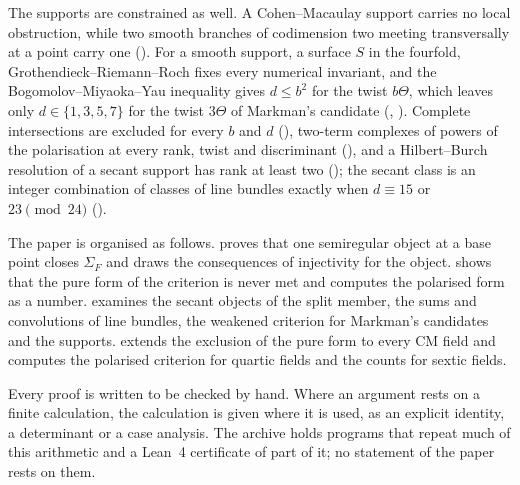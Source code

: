 The supports are constrained as well. A Cohen--Macaulay support carries no
local obstruction, while two smooth branches of codimension two meeting
transversally at a point carry one (). For a smooth support, a surface $S$ in the
fourfold, Grothendieck--Riemann--Roch fixes every numerical invariant, and the
Bogomolov--Miyaoka--Yau inequality gives $d\le b^{2}$ for the twist
$b\Theta$, which leaves only $d\in\{1,3,5,7\}$ for the twist $3\Theta$ of
Markman's candidate (,
). Complete
intersections are excluded for every $b$ and $d$ (), two-term
complexes of powers of the polarisation at every rank, twist and
discriminant (), and a Hilbert--Burch resolution of a
secant support has rank at least two (); the secant
class is an integer combination of classes of line bundles exactly when
$d\equiv15$ or $23\pmod{24}$ ().


The paper is organised as follows.  proves that one
semiregular object at a base point closes $\Sigma_{F}$ and draws the
consequences of injectivity for the object.  shows that
the pure form of the criterion is never met and computes the polarised form
as a number.  examines the secant objects of the
split member, the sums and convolutions of line bundles, the weakened
criterion for Markman's candidates and the supports. 
extends the exclusion of the pure form to every CM field and computes the
polarised criterion for quartic fields and the counts for sextic fields.

Every proof is written to be checked by hand. Where an argument rests on a
finite calculation, the calculation is given where it is used, as an explicit
identity, a determinant or a case analysis. The archive \cite{BMB26} holds
programs that repeat much of this arithmetic and a Lean~4 certificate of
part of it; no statement of the paper rests on them.
